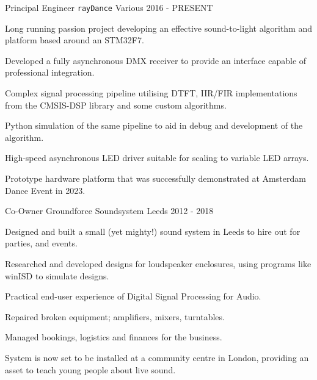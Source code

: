 

\begin{cventries}

  \cventry
    {Principal Engineer} %
    {\texttt{rayDance}} %
    {Various} %
    {2016 - PRESENT} %
    {
      Long running passion project developing an effective sound-to-light algorithm and platform based around an STM32F7.
      \begin{cvitems} %
        \item {Developed a fully asynchronous DMX receiver to provide an interface capable of professional integration.}
        \item {Complex signal processing pipeline utilising DTFT, IIR/FIR implementations from the CMSIS-DSP library and some custom algorithms.}
        \item {Python simulation of the same pipeline to aid in debug and development of the algorithm.}
        \item {High-speed asynchronous LED driver suitable for scaling to variable LED arrays.}
        \item {Prototype hardware platform that was successfully demonstrated at Amsterdam Dance Event in 2023.}
      \end{cvitems}
    }

    \cventry
    {Co-Owner}
    {Groundforce Soundsystem}
    {Leeds}
    {2012 - 2018}
    {Designed and built a small (yet mighty!) sound system in Leeds to hire out for parties, and events.
    \begin{cvitems}
        \item Researched and developed designs for loudspeaker enclosures, using programs like winISD to simulate designs.
        \item Practical end-user experience of Digital Signal Processing for Audio.
        \item Repaired broken equipment; amplifiers, mixers, turntables.
        \item Managed bookings, logistics and finances for the business.
        \item System is now set to be installed at a community centre in London, providing an asset to teach young people about live sound.
    \end{cvitems}
    }


\end{cventries}
